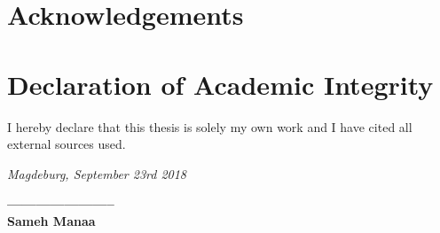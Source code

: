 


{\chapter*{Acknowledgements}}



{\chapter*{Declaration of Academic Integrity}}


I hereby declare that this thesis is solely my own work and I have cited all external sources used.

\textit{Magdeburg, September 23rd 2018} 



\begin{flushright}
\textbf{———————–} \\
\textbf{Sameh Manaa}
\end{flushright}
